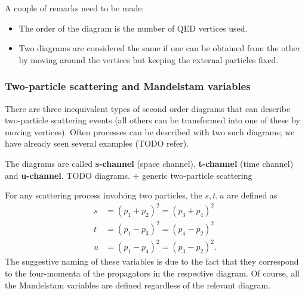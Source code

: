 A couple of remarks need to be made:
\begin{itemize}
\item The order of the diagram is the number of QED vertices used.
\item Two diagrams are considered the same if one can be obtained from the other by moving around the vertices but keeping the external particles fixed.
\end{itemize}

\subsubsection{Two-particle scattering and Mandelstam variables}
There are three inequivalent types of second order diagrams that can describe two-particle scattering events (all others can be transformed into one of these by moving vertices). Often processes can be described with two such diagrams; we have already seen several examples (TODO refer).

The diagrams are called \textbf{s-channel} (space channel), \textbf{t-channel} (time channel) and \textbf{u-channel}.
TODO diagrams. + generic two-particle scattering

For any scattering process involving two particles, the  $s,t,u$ are defined as
\begin{align*}
s &= (p_1 + p_2)^2 = (p_3 + p_4)^2 \\
t &= (p_1 - p_3)^2 = (p_4 - p_2)^2 \\
u &= (p_1 - p_4)^2 = (p_3 - p_2)^2.
\end{align*}
The suggestive naming of these variables is due to the fact that they correspond to the four-momenta of the propagators in the respective diagram. Of course, all the Mandelstam variables are defined regardless of the relevant diagram.

